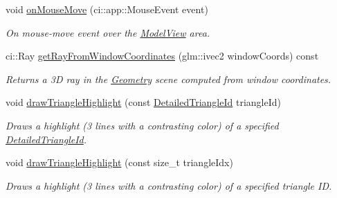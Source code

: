 \begin{DoxyCompactItemize}
\mbox{\label{classpepr3d_1_1_model_view_a7223e1c00bbf6401b11b55d49bed71c5}} 
void \mbox{\hyperlink{classpepr3d_1_1_model_view_a7223e1c00bbf6401b11b55d49bed71c5}{on\+Mouse\+Move}} (ci\+::app\+::\+Mouse\+Event event)
\begin{DoxyCompactList}\small\item\em On mouse-\/move event over the \mbox{\hyperlink{classpepr3d_1_1_model_view}{Model\+View}} area. \end{DoxyCompactList}\item 
\mbox{\label{classpepr3d_1_1_model_view_add99723c6e0ac1041b29b9a54902b157}} 
ci\+::\+Ray \mbox{\hyperlink{classpepr3d_1_1_model_view_add99723c6e0ac1041b29b9a54902b157}{get\+Ray\+From\+Window\+Coordinates}} (glm\+::ivec2 window\+Coords) const
\begin{DoxyCompactList}\small\item\em Returns a 3D ray in the \mbox{\hyperlink{classpepr3d_1_1_geometry}{Geometry}} scene computed from window coordinates. \end{DoxyCompactList}\item 
\mbox{\label{classpepr3d_1_1_model_view_ab31d990c6c32a93af35258ce2e512db2}} 
void \mbox{\hyperlink{classpepr3d_1_1_model_view_ab31d990c6c32a93af35258ce2e512db2}{draw\+Triangle\+Highlight}} (const \mbox{\hyperlink{structpepr3d_1_1_detailed_triangle_id}{Detailed\+Triangle\+Id}} triangle\+Id)
\begin{DoxyCompactList}\small\item\em Draws a highlight (3 lines with a contrasting color) of a specified \mbox{\hyperlink{structpepr3d_1_1_detailed_triangle_id}{Detailed\+Triangle\+Id}}. \end{DoxyCompactList}\item 
\mbox{\label{classpepr3d_1_1_model_view_a82f24b5d17a8352e76a69d87f4359d39}} 
void \mbox{\hyperlink{classpepr3d_1_1_model_view_a82f24b5d17a8352e76a69d87f4359d39}{draw\+Triangle\+Highlight}} (const size\+\_\+t triangle\+Idx)
\begin{DoxyCompactList}\small\item\em Draws a highlight (3 lines with a contrasting color) of a specified triangle ID. \end{DoxyCompactList}\item 

\end{DoxyCompactItemize}
